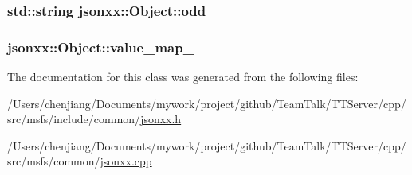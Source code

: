 \subsubsection[{odd}]{\setlength{\rightskip}{0pt plus 5cm}std\+::string jsonxx\+::\+Object\+::odd\hspace{0.3cm}{\ttfamily [protected]}}\label{classjsonxx_1_1_object_afd8fcb788db78b318d3a90d18c353b2c}
\hypertarget{classjsonxx_1_1_object_a62b42bf6c5e7ac37f5c0311c737cc66b}{}
\subsubsection[{value\+\_\+map\+\_\+}]{ jsonxx\+::\+Object\+::value\+\_\+map\+\_\+\hspace{0.3cm}{\ttfamily [protected]}}\label{classjsonxx_1_1_object_a62b42bf6c5e7ac37f5c0311c737cc66b}


The documentation for this class was generated from the following files\+:\begin{DoxyCompactItemize}
\item 
/\+Users/chenjiang/\+Documents/mywork/project/github/\+Team\+Talk/\+T\+T\+Server/cpp/src/msfs/include/common/\hyperlink{msfs_2include_2common_2jsonxx_8h}{jsonxx.\+h}\item 
/\+Users/chenjiang/\+Documents/mywork/project/github/\+Team\+Talk/\+T\+T\+Server/cpp/src/msfs/common/\hyperlink{msfs_2common_2jsonxx_8cpp}{jsonxx.\+cpp}\end{DoxyCompactItemize}
